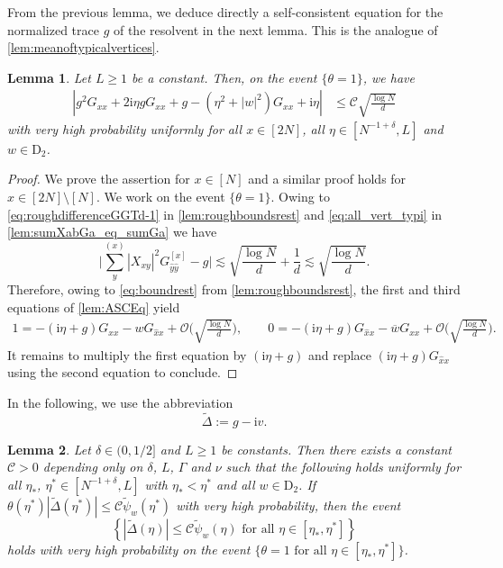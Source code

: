 \documentclass[10pt,a4paper]{amsart}
\newcommand{\ii}{\mathrm{i}}
\newcommand{\abs}[1]{\left| #1 \right|}
\newtheorem{lemma}{Lemma}[section]
\numberwithin{equation}{section}
\newcommand*\barr[1]{\overline{#1}}
\newcommand*\bset[1]{[#1]}
\newcommand*\ubarr[1]{{\widehat{#1}}}
\begin{document}
	From the previous lemma, we deduce directly a self-consistent equation for the normalized trace $g$ of the resolvent in the next lemma. This is the analogue of \cref{lem:meanoftypicalvertices}.  
	\begin{lemma}\label{lem:stielt_first_mean}
		Let $L \geq 1$ be a constant. Then, on the event $\{\theta =1\}$, we have  
		\begin{align*}
			|g^2 G_{xx} + 2\ii \eta g G_{xx} + g -(\eta^2 + \abs{w}^2) G_{xx} + \ii \eta| &\le  \mathcal{C} \sqrt{\frac{\log N}{d}}
		\end{align*}
		with very high probability
		uniformly for all $x\in [2N]$, all $\eta \in [N^{-1+ \delta},L]$ and $w \in \mathrm{D}_2$. 
	\end{lemma}
	\begin{proof}
		We prove the assertion for $x \in [N]$ and a similar proof holds for $x \in [2N]\setminus [N]$. We work on the event $\{\theta =1\}$. Owing to \eqref{eq:roughdifferenceGGTd-1} in \cref{lem:roughboundsrest} and \eqref{eq:all_vert_typi} in \cref{lem:sumXabGa_eq_sumGa} we have 
		\begin{equation}\label{eq:concentrate_around_Stielt}
			\biggl|\sum_{y}^{(x)} |X_{xy}|^2 G_{\ubarr{y} \ubarr{y}}^{\bset{x}} - g\biggr|\lesssim \sqrt{\frac{\log N}{d}} + \frac{1}{d} \lesssim \sqrt{\frac{\log N}{d}}. 
		\end{equation}
		Therefore, owing to \eqref{eq:boundrest} from \cref{lem:roughboundsrest},  the first and third equations of \cref{lem:ASCEq} yield 
		\begin{align*}
			1 = -(\ii \eta + g ) G_{xx} - w G_{\ubarr{x}x} + \mathcal O \bigg(\sqrt{\frac{\log N}{d}}\bigg), \qquad 
			0 = -(\ii \eta + g) G_{\ubarr{x}x} - \barr{w} G_{xx} + \mathcal O \bigg(\sqrt{\frac{\log N}{d}}\bigg).
		\end{align*}
		It remains to multiply the first equation by $(\ii \eta + g)$ and replace $(\ii \eta + g)G_{\ubarr{x}x}$ using the second equation to conclude.
	\end{proof}
	In the following, we use the abbreviation 
	\begin{equation*}
		\widetilde{\Delta}:= g - \ii v.
	\end{equation*}
	\begin{lemma}\label{lem:3rddegeqonDelta2}
		Let $\delta \in (0,1/2]$ and $L \geq 1$ be constants. Then there exists a constant $\mathcal C >0$ depending only on $\delta$, $L$, $\Gamma$ and $\nu$ such that the following holds uniformly for all $\eta_*$, $\eta^* \in [N^{-1+\delta},L]$ with $\eta_* < \eta^*$ and all $w \in \mathrm{D}_2$. If 
		$\theta (\eta^\ast) |\widetilde{\Delta}(\eta^{\ast})| \leq \mathcal C \widetilde{\psi}_w(\eta^\ast)  $ 
		with very high probability, then the event
		\[ 
		\left\{ |\widetilde{\Delta}(\eta)| \leq \mathcal C \widetilde{\psi}_w(\eta)  \text{ for all } \eta \in [\eta_*,\eta^*] 
		\right\}
		\] 
		holds with very high probability on the event $\{ \theta = 1 \text{ for all } \eta \in [\eta_*, \eta^*]\}$. 
	\end{lemma}
	
\end{document}
